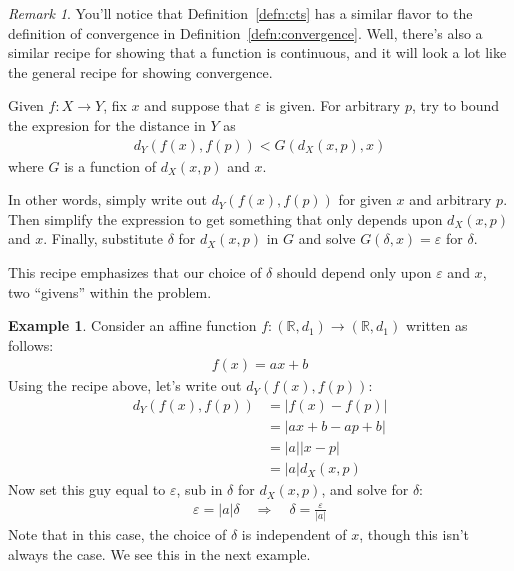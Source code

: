 \documentclass[12pt]{article}
\theoremstyle{plain}
\theoremstyle{definition}
\newtheorem{ex}[thm]{Example}
\theoremstyle{remark}
\newtheorem*{rmk}{Remark}
\newcommand{\R}{\mathbb{R}}
\begin{document}
\begin{rmk}
You'll notice that Definition~\ref{defn:cts} has a similar flavor to the
definition of convergence in Definition~\ref{defn:convergence}. Well,
there's also a similar recipe for showing that a function is continuous,
and it will look a lot like the general recipe for showing convergence.

Given $f:X\rightarrow Y$, fix $x$ and suppose that $\varepsilon$ is
given. For arbitrary $p$, try to bound the expresion for the distance in
$Y$ as
\begin{align*}
  d_Y(f(x), f(p)) < G\left(d_X(x,p), x\right)
\end{align*}
where $G$ is a function of $d_X(x,p)$ and $x$.

In other words, simply write out $d_Y(f(x),f(p))$ for given $x$ and
arbitrary $p$.  Then simplify the expression to get something that only
depends upon $d_X(x,p)$ and $x$. Finally, substitute $\delta$ for
$d_X(x,p)$ in $G$ and solve $G(\delta,x)=\varepsilon$ for $\delta$.

This recipe emphasizes that our choice of $\delta$ should depend only
upon $\varepsilon$ and $x$, two ``givens'' within the problem.
\end{rmk}

\begin{ex}
Consider an affine function $f:(\R,d_1) \rightarrow
(\R,d_1)$ written as follows:
\begin{align*}
  f(x) = ax + b
\end{align*}
Using the recipe above, let's write out $d_Y(f(x),f(p))$:
\begin{align*}
  d_Y(f(x),f(p))
  &= |f(x)-f(p)|\\
  &= |ax+b-ap+b|\\
  &= |a||x-p|\\
  &= |a|d_X(x,p)
\end{align*}
Now set this guy equal to $\varepsilon$, sub in $\delta$ for $d_X(x,p)$,
and solve for $\delta$:
\begin{align*}
  \varepsilon = |a| \delta
  \quad \Rightarrow\quad
  \delta = \frac{\varepsilon}{|a|}
\end{align*}
Note that in this case, the choice of $\delta$ is independent of $x$,
though this isn't always the case. We see this in the next example.
\end{ex}
\end{document}
